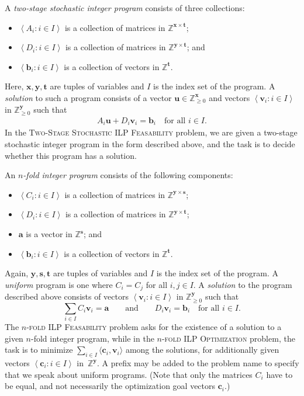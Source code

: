 \documentclass{theoretics}
\renewcommand{\geq}{\geqslant}
\newcommand{\Z}{\mathbb{Z}}
\newcommand{\Zn}{\Z_{\geq 0}}
\newcommand{\tup}[1]{{\mathbf{#1}}}
\newcommand{\xx}{\tup x}
\newcommand{\yy}{\tup y}
\newcommand{\sv}{\tup s}
\newcommand{\tv}{\tup t}
\newcommand{\av}{\tup a}
\newcommand{\bb}{\tup b}
\newcommand{\cc}{\tup c}
\newcommand{\dd}{\tup d}
\newcommand{\uu}{\tup u}
\newcommand{\myvv}{\tup v} %
\newcommand{\matrices}[3]{#1^{#2\times #3}}
\newcommand{\mset}[1]{\left\langle #1\right\rangle}
\newcommand{\sca}[2]{\langle #1,#2\rangle}
\newcommand{\nfoldFeas}{\textsc{$n$-fold ILP Feasability}}
\newcommand{\nfoldOpt}{\textsc{$n$-fold ILP Optimization}}
\newcommand{\stageFeas}{\textsc{Two-Stage Stochastic ILP Feasability}}
\newcommand{\stageOpt}{\textsc{Two-Stage Stochastic ILP Optimization}}
\newcommand{\nfold}{$n$-fold}
\newcommand{\stage}{two-stage stochastic}
\begin{document}
A {\em{\stage{} integer program}} consists of three collections:
\begin{itemize}[nosep]
 \item $\mset{A_i\colon i\in I}$ is a collection of matrices in $\matrices{\Z}{\xx}{\tv}$;
 \item $\mset{D_i\colon i\in I}$ is a collection of matrices in $\matrices{\Z}{\yy}{\tv}$; and
 \item $\mset{\bb_i\colon i\in I}$ is a collection of vectors in $\Z^{\tv}$.
\end{itemize}
Here, $\xx,\yy,\tv$ are tuples of variables and $I$ is the index set of the program. A {\em{solution}} to such a program consists of a vector $\uu\in \Zn^\xx$ and vectors $\mset{\myvv_i\colon i\in I}$ in $\Zn^{\yy}$ such that
\begin{gather*}
A_i\uu+D_i\myvv_i = \bb_i \quad \textrm{for all }i\in I.
\end{gather*}
In the \stageFeas{} problem, we are given a \stage{} integer program in the form described above, and the task is to decide whether this program has a solution.


An {\em{\nfold{} integer program}} consists of the following components:
\begin{itemize}[nosep]
 \item $\mset{C_i\colon i\in I}$ is a collection of matrices in $\matrices{\Z}{\yy}{\sv}$;
 \item $\mset{D_i\colon i\in I}$ is a collection of matrices in $ \matrices{\Z}{\yy}{\tv}$;
 \item $\av$ is a vector in $\Z^{\sv}$; and
 \item $\mset{\bb_i\colon i\in I}$ is a collection of vectors in $\Z^{\tv}$.
\end{itemize}
Again, $\yy,\sv,\tv$ are tuples of variables and $I$ is the index set of the program. A {\em{uniform}} program is one where $C_i=C_j$ for all $i,j\in I$.
A {\em{solution}} to the program described above consists of vectors $\mset{\myvv_i\colon i\in I}$ in $\Zn^\yy$ such that
$$\sum_{i\in I}C_i\myvv_i=\av\qquad\textrm{and}\qquad D_i\myvv_i=\bb_i\quad\textrm{for all }i\in I.$$
The \nfoldFeas{} problem asks for the existence of a solution to a given \nfold{} integer program, while in the \nfoldOpt{} problem, the task is to minimize $\sum_{i\in I}\sca{\cc_i}{\myvv_i}$ among the solutions, for additionally given vectors $\mset{\cc_i\colon i\in I}$ in~$\Z^\yy$. A prefix {} may be added to the problem name to specify that we speak about uniform programs. (Note that only the matrices $C_i$ have to be equal, and not necessarily the optimization goal vectors $\cc_i$.)
\end{document}
